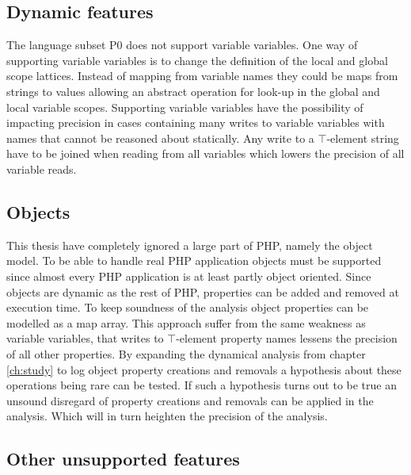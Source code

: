 \subsection{Dynamic features}
The language subset P0 does not support variable variables. One way of supporting variable variables is to change the definition of the local and global scope lattices. Instead of mapping from variable names they could be maps from strings to values allowing an abstract operation for look-up in the global and local variable scopes. Supporting variable variables have the possibility of impacting precision in cases containing many writes to variable variables with names that cannot be reasoned about statically. Any write to a $\top$-element string have to be joined when reading from all variables which lowers the precision of all variable reads.



\subsection{Objects}
This thesis have completely ignored a large part of PHP, namely the object model. To be able to handle real PHP application objects must be supported since almost every PHP application is at least partly object oriented. Since objects are dynamic as the rest of PHP, properties can be added and removed at execution time. To keep soundness of the analysis object properties can be modelled as a map array. This approach suffer from the same weakness as variable variables, that writes to $\top$-element property names lessens the precision of all other properties. By expanding the dynamical analysis from chapter \ref{ch:study} to log object property creations and removals a hypothesis about these operations being rare can be tested. If such a hypothesis turns out to be true an unsound disregard of property creations and removals can be applied in the analysis. Which will in turn heighten the precision of the analysis.

\subsection{Other unsupported features}
